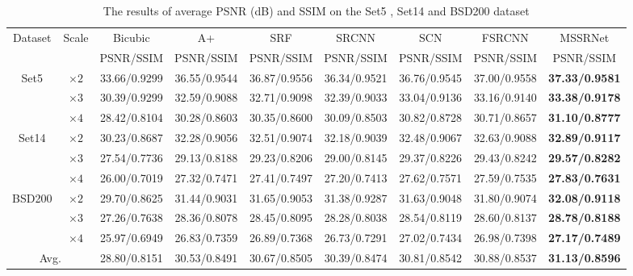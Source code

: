 \documentclass{article}
\begin{document}
\begin{table*}[]
\small
\centering
\caption{The results of average PSNR (dB) and SSIM on the Set5 \cite{ref18}, Set14 \cite{ref19} and BSD200 \cite{ref20} dataset}
\label{tab:quantitative}
\begin{tabular}{|c|c|c|c|c|c|c|c|c|}
\hline
\multirow{2}{*}{Dataset} & \multirow{2}{*}{Scale} & Bicubic      & A+           & SRF          & SRCNN        & SCN          & FSRCNN       & MSSRNet               \\ \cline{3-9} 
                         &                        & PSNR/SSIM    & PSNR/SSIM    & PSNR/SSIM    & PSNR/SSIM    & PSNR/SSIM    & PSNR/SSIM    & PSNR/SSIM             \\ \hline
\multirow{3}{*}{Set5}    & $ \times 2$                      & 33.66/0.9299 & 36.55/0.9544 & 36.87/0.9556 & 36.34/0.9521 & 36.76/0.9545 & 37.00/0.9558 & \textbf{37.33/0.9581} \\ \cline{2-9} 
                         & $ \times 3$                     & 30.39/0.9299 & 32.59/0.9088 & 32.71/0.9098 & 32.39/0.9033 & 33.04/0.9136 & 33.16/0.9140 & \textbf{33.38/0.9178} \\ \cline{2-9} 
                         & $ \times 4$                      & 28.42/0.8104 & 30.28/0.8603 & 30.35/0.8600 & 30.09/0.8503 & 30.82/0.8728 & 30.71/0.8657 & \textbf{31.10/0.8777} \\ \hline
\multirow{3}{*}{Set14}   & $ \times 2$                      & 30.23/0.8687 & 32.28/0.9056 & 32.51/0.9074 & 32.18/0.9039 & 32.48/0.9067 & 32.63/0.9088 & \textbf{32.89/0.9117} \\ \cline{2-9} 
                         & $ \times 3$                      & 27.54/0.7736 & 29.13/0.8188 & 29.23/0.8206 & 29.00/0.8145 & 29.37/0.8226 & 29.43/0.8242 & \textbf{29.57/0.8282} \\ \cline{2-9} 
                         & $ \times 4$                      & 26.00/0.7019 & 27.32/0.7471 & 27.41/0.7497 & 27.20/0.7413 & 27.62/0.7571 & 27.59/0.7535 & \textbf{27.83/0.7631} \\ \hline
\multirow{3}{*}{BSD200}  & $ \times 2$                      & 29.70/0.8625 & 31.44/0.9031 & 31.65/0.9053 & 31.38/0.9287 & 31.63/0.9048 & 31.80/0.9074 & \textbf{32.08/0.9118} \\ \cline{2-9} 
                         & $ \times 3$                      & 27.26/0.7638 & 28.36/0.8078 & 28.45/0.8095 & 28.28/0.8038 & 28.54/0.8119 & 28.60/0.8137 & \textbf{28.78/0.8188} \\ \cline{2-9} 
                         & $ \times 4$                      & 25.97/0.6949 & 26.83/0.7359 & 26.89/0.7368 & 26.73/0.7291 & 27.02/0.7434 & 26.98/0.7398 & \textbf{27.17/0.7489} \\ \hline
\multicolumn{2}{|c|}{Avg.}                        & 28.80/0.8151 & 30.53/0.8491 & 30.67/0.8505 & 30.39/0.8474 & 30.81/0.8542 & 30.88/0.8537 & \textbf{31.13/0.8596} \\ \hline
\end{tabular}
\vspace{-0.5cm}
\end{table*}
\end{document}

